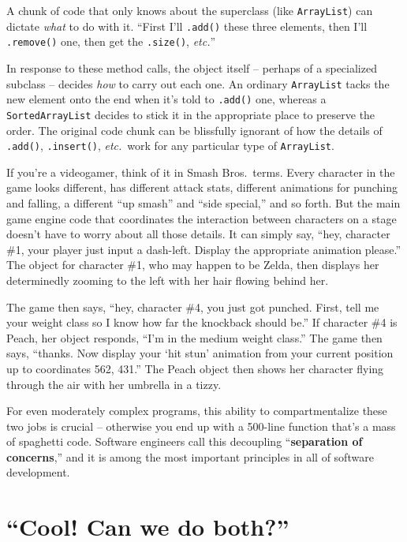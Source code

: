A chunk of code that only knows about the superclass (like \texttt{ArrayList})
can dictate \textit{what} to do with it. ``First I'll \texttt{.add()} these
three elements, then I'll \texttt{.remove()} one, then get the
\texttt{.size()}, \textit{etc.}''

In response to these method calls, the object itself -- perhaps of a
specialized subclass -- decides \textit{how} to carry out each one. An
ordinary \texttt{ArrayList} tacks the new element onto the end when it's told
to \texttt{.add()} one, whereas a \texttt{SortedArrayList} decides to stick it
in the appropriate place to preserve the order. The original code chunk can be
blissfully ignorant of how the details of \texttt{.add()}, \texttt{.insert()},
\textit{etc.}~work for any particular type of \texttt{ArrayList}.

If you're a videogamer, think of it in Smash Bros.~terms. Every character in
the game looks different, has different attack stats, different animations for
punching and falling, a different ``up smash'' and ``side special,'' and so
forth. But the main game engine code that coordinates the interaction between
characters on a stage doesn't have to worry about all those details. It can
simply say, ``hey, character \#1, your player just input a dash-left. Display
the appropriate animation please.'' The object for character \#1, who may
happen to be Zelda, then displays her determinedly zooming to the left with
her hair flowing behind her.

The game then says, ``hey, character \#4, you just got punched. First, tell me
your weight class so I know how far the knockback should be.'' If character \#4
is Peach, her object responds, ``I'm in the medium weight class.'' The game
then says, ``thanks. Now display your `hit stun' animation from your current
position up to coordinates 562, 431.'' The Peach object then shows her
character flying through the air with her umbrella in a tizzy.

For even moderately complex programs, this ability to compartmentalize these
two jobs is crucial -- otherwise you end up with a 500-line function that's a
mass of spaghetti code. Software engineers call this decoupling
``\textbf{separation of concerns},'' and it is among the most important
principles in all of software development.

\section{``Cool! Can we do both?''}

